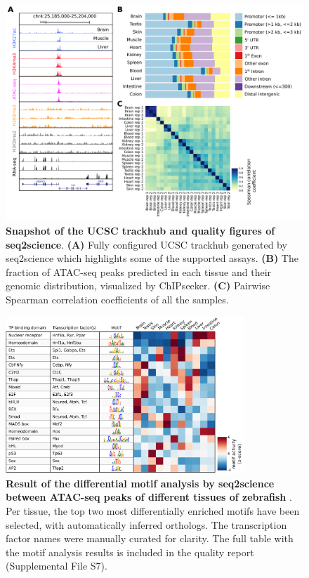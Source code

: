 \begin{figure}
	\centering
	\includegraphics[width=1.0\textwidth]{ch.seq2science/imgs/zebrafish_fig1.png}
	\caption{\label{fig:zebrafish_fig1} \textbf{Snapshot of the UCSC trackhub and quality figures of seq2science}. \textbf{(A)} Fully configured UCSC trackhub generated by seq2science which highlights some of the supported assays. \textbf{(B)}  The fraction of ATAC-seq peaks predicted in each tissue and their genomic distribution, visualized by ChIPseeker. \textbf{(C)} Pairwise Spearman correlation coefficients of all the samples. }
\end{figure}

\begin{figure}
	\centering
	\includegraphics[width=0.8\textwidth]{ch.seq2science/imgs/zebrafish_fig2.png}
	\caption{\label{fig:zebrafish_fig2} \textbf{Result of the differential motif analysis by seq2science between ATAC-seq peaks of different tissues of zebrafish} \cite{Yang2020}. Per tissue, the top two most differentially enriched motifs have been selected, with automatically inferred orthologs. The transcription factor names were manually curated for clarity. The full table with the motif analysis results is included in the quality report (Supplemental File S7).}
\end{figure}

